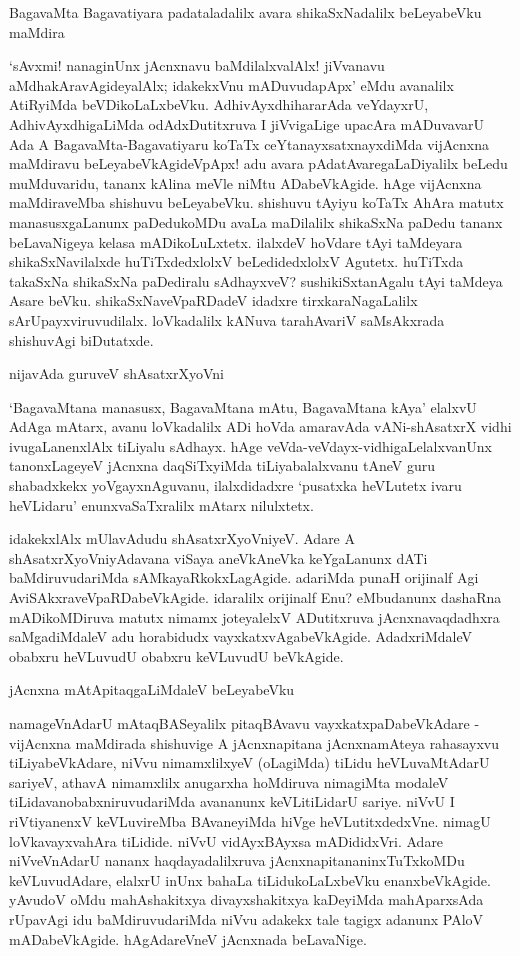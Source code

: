 BagavaMta Bagavatiyara padataladalilx avara shikaSxNadalilx beLeyabeVku maMdira

`sAvxmi! nanaginUnx jAcnxnavu baMdilalxvalAlx! jiVvanavu aMdhakAravAgideyalAlx; idakekxVnu mADuvudapApx' eMdu avanalilx AtiRyiMda beVDikoLaLxbeVku. AdhivAyxdhihararAda veYdayxrU, AdhivAyxdhigaLiMda odAdxDutitxruva I jiVvigaLige upacAra mADuvavarU Ada A BagavaMta-Bagavatiyaru koTaTx ceYtanayxsatxnayxdiMda vijAcnxna maMdiravu beLeyabeVkAgideVpApx! adu avara pAdatAvaregaLaDiyalilx beLedu muMduvaridu, tananx kAlina meVle niMtu ADabeVkAgide. hAge vijAcnxna maMdiraveMba shishuvu beLeyabeVku. shishuvu tAyiyu koTaTx AhAra matutx manasusxgaLanunx paDedukoMDu avaLa maDilalilx shikaSxNa paDedu tananx beLavaNigeya kelasa mADikoLuLxtetx. ilalxdeV hoVdare tAyi taMdeyara shikaSxNavilalxde huTiTxdedxlolxV beLedidedxlolxV Agutetx. huTiTxda takaSxNa shikaSxNa paDediralu sAdhayxveV? sushikiSxtanAgalu tAyi taMdeya Asare beVku. shikaSxNaveVpaRDadeV idadxre tirxkaraNagaLalilx sArUpayxviruvudilalx. loVkadalilx kANuva tarahAvariV saMsAkxrada shishuvAgi biDutatxde.

nijavAda guruveV shAsatxrXyoVni

`BagavaMtana manasusx, BagavaMtana mAtu, BagavaMtana kAya' elalxvU AdAga mAtarx, avanu loVkadalilx ADi hoVda amaravAda vANi-shAsatxrX vidhi ivugaLanenxlAlx tiLiyalu sAdhayx. hAge veVda-veVdayx-vidhigaLelalxvanUnx tanonxLageyeV jAcnxna daqSiTxyiMda tiLiyabalalxvanu tAneV guru shabadxkekx yoVgayxnAguvanu, ilalxdidadxre `pusatxka heVLutetx ivaru heVLidaru' enunxvaSaTxralilx mAtarx nilulxtetx.

idakekxlAlx mUlavAdudu shAsatxrXyoVniyeV. Adare A shAsatxrXyoVniyAdavana viSaya aneVkAneVka keYgaLanunx dATi baMdiruvudariMda sAMkayaRkokxLagAgide. adariMda punaH orijinalf Agi AviSAkxraveVpaRDabeVkAgide. idaralilx orijinalf Enu? eMbudanunx dashaRna mADikoMDiruva matutx nimamx joteyalelxV ADutitxruva jAcnxnavaqdadhxra saMgadiMdaleV adu horabidudx vayxkatxvAgabeVkAgide. AdadxriMdaleV obabxru heVLuvudU obabxru keVLuvudU beVkAgide.

jAcnxna mAtApitaqgaLiMdaleV beLeyabeVku

namageVnAdarU mAtaqBASeyalilx pitaqBAvavu vayxkatxpaDabeVkAdare - vijAcnxna maMdirada shishuvige A jAcnxnapitana jAcnxnamAteya rahasayxvu tiLiyabeVkAdare, niVvu nimamxlilxyeV (oLagiMda) tiLidu heVLuvaMtAdarU sariyeV, athavA nimamxlilx anugarxha hoMdiruva nimagiMta modaleV tiLidavanobabxniruvudariMda avananunx keVLitiLidarU sariye. niVvU I riVtiyanenxV keVLuvireMba BAvaneyiMda hiVge heVLutitxdedxVne. nimagU loVkavayxvahAra tiLidide. niVvU vidAyxBAyxsa mADididxVri. Adare niVveVnAdarU nananx haqdayadalilxruva jAcnxnapitananinxTuTxkoMDu keVLuvudAdare, elalxrU inUnx bahaLa tiLidukoLaLxbeVku enanxbeVkAgide. yAvudoV oMdu mahAshakitxya divayxshakitxya kaDeyiMda mahAparxsAda rUpavAgi idu baMdiruvudariMda niVvu adakekx tale tagigx adanunx PAloV mADabeVkAgide. hAgAdareVneV jAcnxnada beLavaNige.


